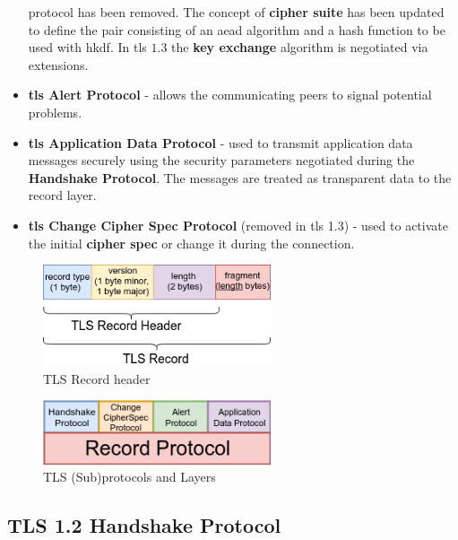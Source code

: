 \documentclass{llncs}
\begin{document}
\begin{itemize}
   protocol has been removed. The concept of \textbf{cipher suite} has been updated
   to define the pair consisting of an \gls{aead} algorithm and a hash function to be used with
   \gls{hkdf}. In \gls{tls} $1.3$ the \textbf{key exchange} algorithm is negotiated via
   extensions.
  \item \textbf{\gls{tls} Alert Protocol} - allows the communicating peers to
  signal potential problems.
  \item \textbf{\gls{tls} Application Data Protocol} - used to transmit application data messages securely using the security parameters negotiated during the \textbf{Handshake Protocol}. The messages are treated as transparent data to the record layer.
  \item \textbf{\gls{tls} Change Cipher Spec Protocol} (removed in \gls{tls} 1.3) -
  used to activate the initial \textbf{cipher spec} or change it during the connection.
\end{itemize}


\begin{figure}
  \centering
  \includegraphics[width=0.6\textwidth]{img/record-header-3.png} %
  \caption{\label{fig:tls-record-header} TLS Record header}
\end{figure}

\begin{figure}
\centering
\includegraphics[width=0.6\textwidth]{img/tls-sub-protocols-3.png} %
\caption{\label{fig:tls-subprotocols} TLS (Sub)protocols and Layers}
\end{figure}

\subsection{TLS 1.2 Handshake Protocol} \label{hsp}
\end{document}
